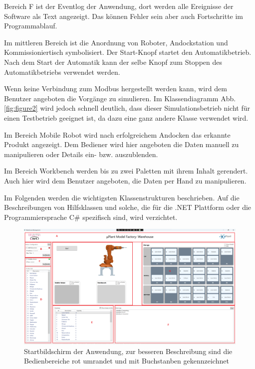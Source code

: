    Bereich \glqq F\grqq{} ist der Eventlog der Anwendung, dort werden alle Ereignisse der Software als Text angezeigt.
    Das können Fehler sein aber auch Fortschritte im Programmablauf.

    Im mittleren Bereich ist die Anordnung von Roboter, Andockstation und Kommissioniertisch symbolisiert.
    Der \glqq Start\grqq -Knopf startet den Automatikbetrieb.
    Nach dem Start der Automatik kann der selbe Knopf zum Stoppen des Automatikbetriebs verwendet werden.

    Wenn keine Verbindung zum Modbus hergestellt werden kann, wird dem Benutzer angeboten die Vorgänge zu simulieren.
    Im Klassendiagramm Abb.\ref{fig:figure2} wird jedoch schnell deutlich, dass dieser Simulationsbetrieb nicht für einen Testbetrieb
    geeignet ist, da dazu eine ganz andere Klasse verwendet wird.

    Im Bereich \glqq Mobile Robot\grqq{} wird nach erfolgreichem Andocken das erkannte Produkt angezeigt.
    Dem Bediener wird hier angeboten die Daten manuell zu manipulieren oder Details ein- bzw. auszublenden.

    Im Bereich \glqq Workbench\grqq{} werden bis zu zwei Paletten mit ihrem Inhalt gerendert.
    Auch hier wird dem Benutzer angeboten, die Daten per Hand zu manipulieren.

    Im Folgenden werden die wichtigsten Klassenstrukturen beschrieben.
    Auf die Beschreibungen von Hilfsklassen und solche, die für die .NET Plattform oder die Programmiersprache C$\#$ spezifisch sind, wird verzichtet.

    \begin{figure}[h]
        \caption[Ansicht des Startbildschirms]
        {\small Startbildschirm der Anwendung, zur besseren Beschreibung sind die Bedienbereiche rot umrandet und mit
        Buchstanben gekennzeichnet}\label{fig:figure}
        \includegraphics[width = \textwidth ]{Bilder/LV_Startbildschirm}
        \centering
    \end{figure}

